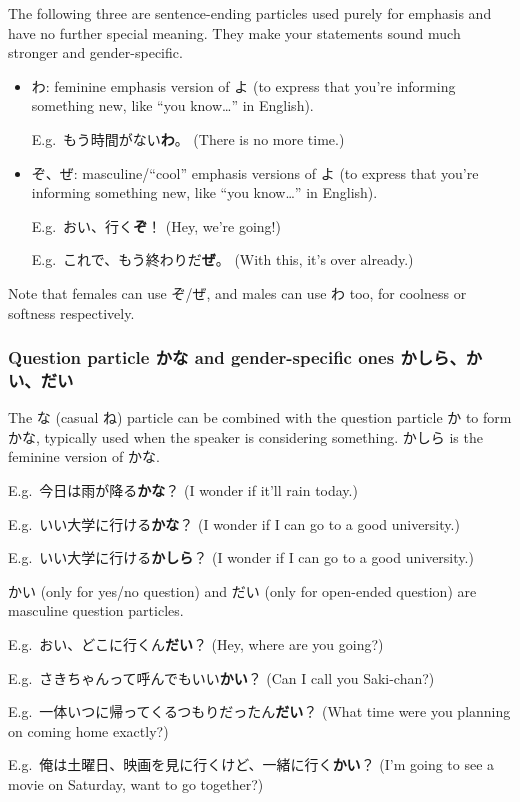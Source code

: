 \documentclass[../nihongo-gakushuu-kyouzai.tex]{subfiles}
\begin{document}
The following three are sentence-ending particles used purely for  emphasis and have no further special meaning. They make your statements sound much stronger and gender-specific.
\begin{itemize}
    \item わ: feminine emphasis version of よ (to express that you're informing something new, like ``you know\dots'' in English).

    E.g.\ もう時間がない\textbf{わ}。 (There is no more time.)
    \item ぞ、ぜ: masculine/``cool'' emphasis versions of よ (to express that you're informing something new, like ``you know\dots'' in English).

    E.g.\ おい、行く\textbf{ぞ}！ (Hey, we're going!)

    E.g.\ これで、もう終わりだ\textbf{ぜ}。 (With this, it's over already.)
\end{itemize}

Note that females can use ぞ/ぜ, and males can use わ too, for coolness or softness respectively.


\subsubsection{Question particle かな and gender-specific ones かしら、かい、だい} \label{sec:gender-specific-question-particles}

The な (casual ね) particle can be combined with the question particle か to form かな, typically used when the speaker is considering something. かしら is the feminine version of かな.

E.g.\ 今日は雨が降る\textbf{かな}？ (I wonder if it'll rain today.)

E.g.\ いい大学に行ける\textbf{かな}？ (I wonder if I can go to a good university.)

E.g.\ いい大学に行ける\textbf{かしら}？ (I wonder if I can go to a good university.)

かい (only for yes/no question) and だい (only for open-ended question) are masculine question particles.

E.g.\ おい、どこに行くん\textbf{だい}？ (Hey, where are you going?)

E.g.\ さきちゃんって呼んでもいい\textbf{かい}？ (Can I call you Saki-chan?)

E.g.\ 一体いつに帰ってくるつもりだったん\textbf{だい}？ (What time were you planning on coming home exactly?)

E.g.\ 俺は土曜日、映画を見に行くけど、一緒に行く\textbf{かい}？ (I'm going to see a movie on Saturday, want to go together?)
\end{document}
